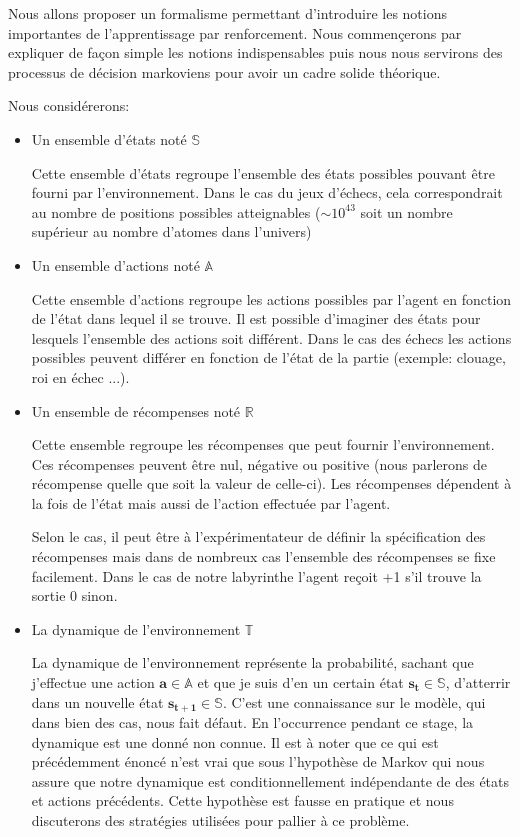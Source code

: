 Nous allons proposer un formalisme  permettant d'introduire les notions importantes de l'apprentissage par renforcement. Nous commençerons par expliquer de façon simple les notions indispensables puis nous nous servirons des processus de décision markoviens pour avoir un cadre solide théorique.

Nous considérerons: 

\begin{itemize}
    \item Un ensemble d'états noté $\bm{\mathbb{S}}$
    
        Cette ensemble d'états regroupe l'ensemble des états possibles pouvant être fourni par l'environnement. Dans le cas du jeux d'échecs, cela correspondrait au nombre de positions possibles atteignables ($\sim 10^{43}$ soit un nombre supérieur au nombre d'atomes dans l'univers)
    
    \item Un ensemble d'actions noté $\bm{\mathbb{A}}$
    
        Cette ensemble d'actions regroupe les actions possibles par l'agent en fonction de l'état dans lequel il se trouve. Il est possible d'imaginer des états pour lesquels l'ensemble des actions soit différent. Dans le cas des échecs les actions possibles peuvent différer en fonction de l'état de la partie (exemple: clouage, roi en échec ...).

    \item Un ensemble de récompenses noté $\bm{\mathbb{R}}$
    
        Cette ensemble regroupe les récompenses que peut fournir l'environnement. Ces récompenses peuvent être nul, négative ou positive (nous parlerons de récompense quelle que soit la valeur de celle-ci). Les récompenses dépendent à la fois de l'état mais aussi de l'action effectuée par l'agent.
    
        Selon le cas, il peut être à l'expérimentateur de définir la spécification des récompenses mais dans de nombreux cas l'ensemble des récompenses se fixe facilement. Dans le cas de notre labyrinthe l'agent reçoit +1 s'il trouve la sortie 0 sinon.
    \item La dynamique de l'environnement $\bm{\mathbb{T}}$
    
        La dynamique de l'environnement représente la probabilité, sachant que j'effectue une action $\bm{a \in \mathbb{A}}$ et que je suis d'en un certain état $\bm{s_t \in \mathbb{S}}$, d'atterrir dans un nouvelle état  $\bm{s_{t+1} \in \mathbb{S}}$. C'est une connaissance sur le modèle, qui dans bien des cas, nous fait défaut. En l'occurrence  pendant ce stage, la dynamique est une donné non connue. Il est à noter que ce qui est précédemment énoncé n'est vrai que sous l'hypothèse de Markov qui nous assure que notre dynamique est conditionnellement indépendante de  des états et actions précédents. Cette hypothèse est fausse en pratique et nous discuterons des stratégies utilisées pour pallier à ce problème. 
    

\end{itemize}

